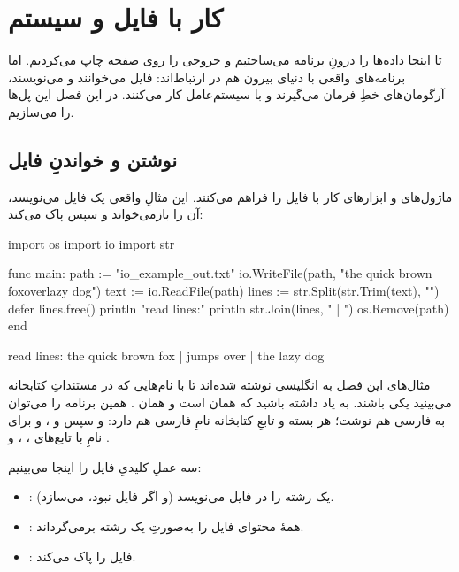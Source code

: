 \chapter{کار با فایل و سیستم}%
\label{ch:files}

تا اینجا داده‌ها را درونِ برنامه می‌ساختیم و خروجی را روی صفحه چاپ می‌کردیم.
اما برنامه‌های واقعی با دنیای بیرون هم در ارتباط‌اند: فایل می‌خوانند و
می‌نویسند، آرگومان‌های خطِ فرمان می‌گیرند و با سیستم‌عامل کار می‌کنند. در این
فصل این پل‌ها را می‌سازیم.

\section{نوشتن و خواندنِ فایل}

ماژول‌های  و  ابزارهای کار با فایل را فراهم می‌کنند. این مثالِ
واقعی یک فایل می‌نویسد، آن را بازمی‌خواند و سپس پاک می‌کند:

\begin{salamen}
import os
import io
import str

func main:
    path := "io_example_out.txt"
    io.WriteFile(path, "the quick brown fox\njumps over\nthe lazy dog\n")
    text := io.ReadFile(path)
    lines := str.Split(str.Trim(text), "\n")
    defer lines.free()
    println "read lines:"
    println str.Join(lines, " | ")
    os.Remove(path)
end
\end{salamen}

\begin{progout}
read lines:
the quick brown fox | jumps over | the lazy dog
\end{progout}

\begin{note}
مثال‌های این فصل به انگلیسی نوشته شده‌اند تا با نام‌هایی که در مستنداتِ
کتابخانه می‌بینید یکی باشند. به یاد داشته باشید که  همان
 است و  همان . همین برنامه را می‌توان
به فارسی هم نوشت؛ هر بسته و تابعِ کتابخانه نامِ فارسی هم دارد:
 و سپس  و
، و برای  نامِ
 با تابع‌های ، ،
 و .
\end{note}

سه عملِ کلیدیِ فایل را اینجا می‌بینیم:
\begin{itemize}
  \item {}: یک رشته را در فایل می‌نویسد (و اگر
        فایل نبود، می‌سازد).
  \item {}: همهٔ محتوای فایل را به‌صورتِ یک رشته
        برمی‌گرداند.
  \item {}: فایل را پاک می‌کند.
\end{itemize}

